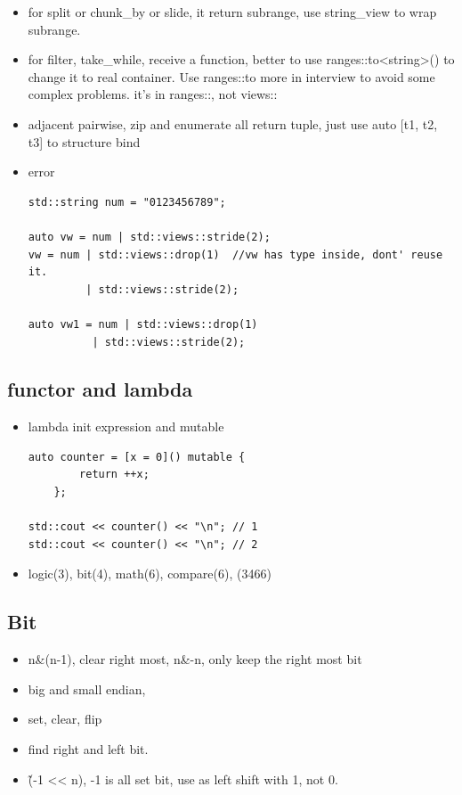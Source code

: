 \documentclass[a4paper,11pt,twoside]{book}
\begin{document}
\begin{itemize}
	\item for split or chunk\_by or slide, it return subrange, use string\_view to wrap subrange.  
	
	\item for filter, take\_while, receive a function, better to use ranges::to<string>() to change it to real container. Use ranges::to more in interview to avoid some complex problems. it's in ranges::, not views::
	
	\item adjacent pairwise, zip and enumerate all return tuple, just use auto [t1, t2, t3] to structure bind 
	
	\item error
\begin{lstlisting}
std::string num = "0123456789";

auto vw = num | std::views::stride(2);
vw = num | std::views::drop(1)  //vw has type inside, dont' reuse it. 
         | std::views::stride(2);
         
auto vw1 = num | std::views::drop(1)
          | std::views::stride(2);        
\end{lstlisting}
	
\end{itemize}

\subsection{functor and lambda}
\begin{itemize}
	\item lambda init expression and mutable
\begin{lstlisting}
auto counter = [x = 0]() mutable {
        return ++x;
    };

std::cout << counter() << "\n"; // 1
std::cout << counter() << "\n"; // 2
\end{lstlisting}

	\item logic(3), bit(4), math(6), compare(6), (3466)
\end{itemize}


\subsection{Bit}
\begin{itemize}
		\item n\&(n-1), clear right most, n\&-n, only keep the right most bit
		
		\item big and small endian,  
		
		\item set, clear, flip
		
		\item find right and left bit.
		
		\item \~(-1 << n), -1 is all set bit, use as left shift with 1, not 0. 
\end{itemize}
\end{document}
